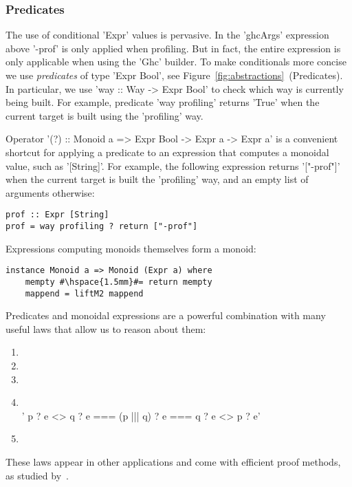 \subsubsection{Predicates}

The use of conditional \lst'Expr' values is pervasive. In the \lst'ghcArgs' expression
above \lst'-prof' is only applied when profiling. But in fact, the entire expression
is only applicable when using the \lst'Ghc' builder. To make conditionals more concise
we use \emph{predicates} of type \lst'Expr Bool', see
Figure~\ref{fig:abstractions}~(Predicates). In particular, we
use \lst'way :: Way -> Expr Bool' to check which way is currently being built.
For example, predicate \lst'way profiling' returns \lst'True' when the
current target is built using the \lst'profiling' way.

Operator \lst'(?) :: Monoid a => Expr Bool -> Expr a -> Expr a' is a
convenient shortcut for applying a predicate to an expression that computes a monoidal value, such
as \lst'[String]'. For example, the following expression returns
\lst'["-prof"]' when the current target is built the \lst'profiling' way, and an
empty list of arguments otherwise:

\begin{lstlisting}
prof :: Expr [String]
prof = way profiling ? return ["-prof"]
\end{lstlisting}

\noindent Expressions computing monoids themselves form a monoid:

\begin{lstlisting}
instance Monoid a => Monoid (Expr a) where
    mempty #\hspace{1.5mm}#= return mempty
    mappend = liftM2 mappend
\end{lstlisting}

\noindent Predicates and monoidal expressions are a powerful combination with
many useful laws that allow us to reason about them:
\begin{enumerate}
  \item {} 
  \item {} 
  \item {} 
  \item {}  \vspace{1mm}\\
  \lst'    p ? e <> q ? e === (p ||| q) ? e === q ? e <> p ? e'
  \item {} 
\end{enumerate}
These laws appear in other applications and come with efficient proof methods,
as studied by~\citet{pg-algebra}.

